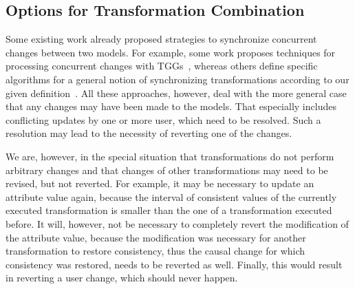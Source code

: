 


\subsection{Options for Transformation Combination}

Some existing work already proposed strategies to synchronize concurrent changes between two models.
For example, some work proposes techniques for processing concurrent changes with \glspl{TGG}~\cite{hermann2012concurrentSynchronization-FASE,orejas2020IncrementalConcurrentSynchronization-FASE}, whereas others define specific algorithms for a general notion of synchronizing transformations according to our given definition~\cite{xiong2013SynchronizingConcurrentUpdates-SoSym,xiong2009parallelUpdates-ICMT}.
All these approaches, however, deal with the more general case that any changes may have been made to the models.
That especially includes conflicting updates by one or more user, which need to be resolved.
Such a resolution may lead to the necessity of reverting one of the changes.

We are, however, in the special situation that transformations do not perform arbitrary changes and that changes of other transformations may need to be revised, but not reverted.
For example, it may be necessary to update an attribute value again, because the interval of consistent values of the currently executed transformation is smaller than the one of a transformation executed before.
It will, however, not be necessary to completely revert the modification of the attribute value, because the modification was necessary for another transformation to restore consistency, thus the causal change for which consistency was restored, needs to be reverted as well.
Finally, this would result in reverting a user change, which should never happen.

